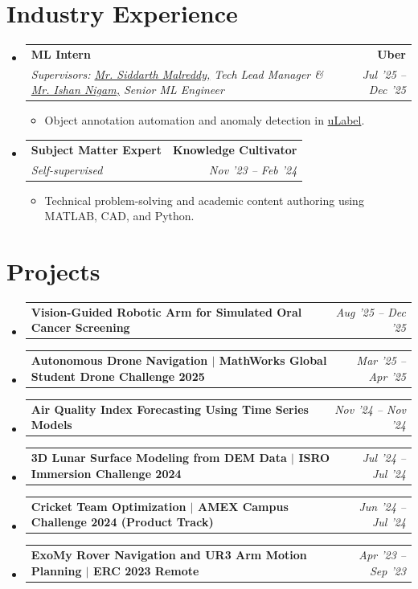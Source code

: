 \documentclass[letterpaper,10pt]{article}
\makeatletter
\newcommand{\resumeItem}[1]{
  \item \small{#1\vspace{-2pt}}
}
\newcommand{\resumeSubheading}[4]{
  \vspace{0pt}\item
  \begin{tabular*}{0.97\textwidth}[t]{l@{\extracolsep{\fill}}r}
    \textbf{#1} & \textbf{#2} \\
    \textit{\small #3} & \textit{\small #4} \\
  \end{tabular*}\vspace{-6pt}
}
\newcommand{\resumeProjectHeading}[2]{
  \vspace{0pt}\item
  \begin{tabular*}{0.97\textwidth}[t]{l@{\extracolsep{\fill}}r}
    \small #1 & #2 \\
  \end{tabular*}\vspace{-6pt}
}
\newcommand{\resumeSubHeadingListStart}{
  \begin{itemize}[leftmargin=0.10in, label={}]\vspace{6pt}
}
\newcommand{\resumeSubHeadingListEnd}{
  \end{itemize}
}
\newcommand{\resumeItemListStart}{
  \begin{itemize}[leftmargin=0.18in]
}
\newcommand{\resumeItemListEnd}{
  \end{itemize}\vspace{-6pt}
}
\makeatother
\begin{document}
\section{Industry Experience}
\resumeSubHeadingListStart
  \resumeSubheading
    {ML Intern}{Uber}
    {Supervisors: {\color{blue}\href{https://in.linkedin.com/in/malreddysid}{Mr. Siddarth Malreddy,}} Tech Lead Manager \& {\color{blue}\href{https://www.linkedin.com/in/ishannigam/}{Mr. Ishan Nigam,}} Senior ML Engineer}{Jul '25 – Dec '25}
  \resumeItemListStart
    \resumeItem{Object annotation automation and anomaly detection in {\color{blue}\href{https://www.uber.com/us/en/ai-solutions/annotation/}{uLabel}}.}
  \resumeItemListEnd

  \resumeSubheading
    {Subject Matter Expert}{Knowledge Cultivator}
    {Self-supervised}{Nov '23 – Feb '24}
  \resumeItemListStart
    \resumeItem{Technical problem-solving and academic content authoring using MATLAB, CAD, and Python.}
  \resumeItemListEnd
\resumeSubHeadingListEnd

\section{Projects}
\resumeSubHeadingListStart
  \resumeProjectHeading
    {\textbf{Vision-Guided Robotic Arm for Simulated Oral Cancer Screening}}
    {\textit{Aug '25 – Dec '25}}

  \resumeProjectHeading
    {\textbf{Autonomous Drone Navigation $|$ MathWorks Global Student Drone Challenge 2025}}
    {\textit{Mar '25 – Apr '25}}

  \resumeProjectHeading
    {\textbf{Air Quality Index Forecasting Using Time Series Models \color{blue}\href{https://drive.google.com/file/d/19VMK7SCWqU9Bv2O01lgY_h-JgHfI49gh/view?usp=drive_link}{\faExternalLink*}}}
    {\textit{Nov '24 – Nov '24}}

  \resumeProjectHeading
    {\textbf{3D Lunar Surface Modeling from DEM Data $|$ ISRO Immersion Challenge 2024 \color{blue}\href{https://drive.google.com/file/d/16G0VYC5aEpGW_xqj6y0GRwX1Hb5cWeJk/view?usp=drive_link}{\faExternalLink*}}}
    {\textit{Jul '24 – Jul '24}}

  \resumeProjectHeading
    {\textbf{Cricket Team Optimization $|$ AMEX Campus Challenge 2024 (Product Track) \color{blue}\href{https://drive.google.com/file/d/1oC9seJ8GRzicnij6xViUjAum3Zq5Vjlr/view?usp=drive_link}{\faExternalLink*}}}
    {\textit{Jun '24 – Jul '24}}

  \resumeProjectHeading
    {\textbf{ExoMy Rover Navigation and UR3 Arm Motion Planning $|$ ERC 2023 Remote \color{blue}\href{https://drive.google.com/file/d/1qAeYAupdwq-eb-d-lgASr4xD_Kj0AXmk/view?usp=drive_link}{\faExternalLink*}}}
    {\textit{Apr '23 – Sep '23}}
\resumeSubHeadingListEnd
\end{document}
